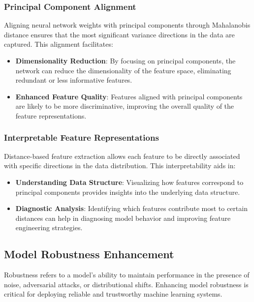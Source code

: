 \subsubsection{Principal Component Alignment}
Aligning neural network weights with principal components through Mahalanobis distance ensures that the most significant variance directions in the data are captured. This alignment facilitates:
\begin{itemize}
    \item \textbf{Dimensionality Reduction}: By focusing on principal components, the network can reduce the dimensionality of the feature space, eliminating redundant or less informative features.
    \item \textbf{Enhanced Feature Quality}: Features aligned with principal components are likely to be more discriminative, improving the overall quality of the feature representations.
\end{itemize}

\subsubsection{Interpretable Feature Representations}
Distance-based feature extraction allows each feature to be directly associated with specific directions in the data distribution. This interpretability aids in:
\begin{itemize}
    \item \textbf{Understanding Data Structure}: Visualizing how features correspond to principal components provides insights into the underlying data structure.
    \item \textbf{Diagnostic Analysis}: Identifying which features contribute most to certain distances can help in diagnosing model behavior and improving feature engineering strategies.
\end{itemize}

\subsection{Model Robustness Enhancement}
\label{subsec:model_robustness}

Robustness refers to a model's ability to maintain performance in the presence of noise, adversarial attacks, or distributional shifts. Enhancing model robustness is critical for deploying reliable and trustworthy machine learning systems.

